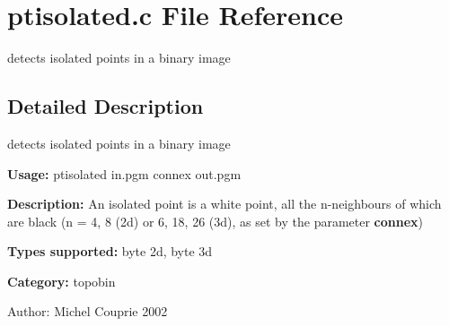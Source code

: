\section{ptisolated.c File Reference}
\label{ptisolated_8c}
detects isolated points in a binary image  




\label{_details}
\subsection{Detailed Description}
detects isolated points in a binary image 

{\bf Usage:} ptisolated in.pgm connex out.pgm

{\bf Description:} An isolated point is a white point, all the n-neighbours of which are black (n = 4, 8 (2d) or 6, 18, 26 (3d), as set by the parameter {\bf connex})

{\bf Types supported:} byte 2d, byte 3d

{\bf Category:} topobin

\begin{Desc}
\item[Author:]Michel Couprie 2002 \end{Desc}
